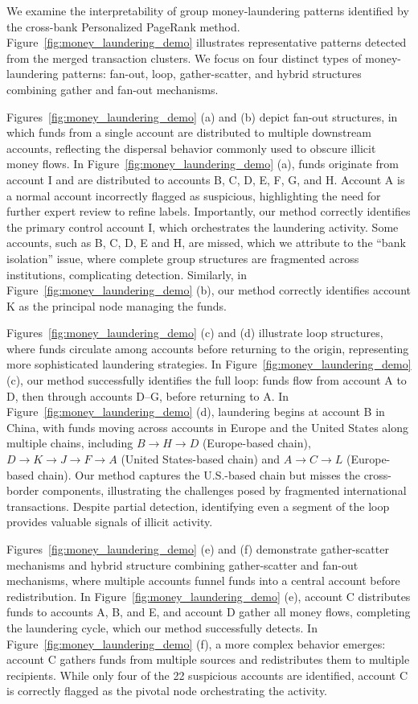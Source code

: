 \documentclass[11pt,english]{article}
\begin{document}
We examine the interpretability of group money-laundering patterns identified by the cross-bank Personalized PageRank method. Figure~\ref{fig:money_laundering_demo} illustrates representative patterns detected from the merged transaction clusters. We focus on four distinct types of money-laundering patterns: fan-out, loop, gather-scatter, and hybrid structures combining gather and fan-out mechanisms.

Figures~\ref{fig:money_laundering_demo} (a) and (b) depict fan-out structures, in which funds from a single account are distributed to multiple downstream accounts, reflecting the dispersal behavior commonly used to obscure illicit money flows. In Figure~\ref{fig:money_laundering_demo} (a), funds originate from account I and are distributed to accounts B, C, D, E, F, G, and H. Account A is a normal account incorrectly flagged as suspicious, highlighting the need for further expert review to refine labels. Importantly, our method correctly identifies the primary control account I, which orchestrates the laundering activity. Some accounts, such as B, C, D, E and H, are missed, which we attribute to the “bank isolation” issue, where complete group structures are fragmented across institutions, complicating detection. Similarly, in Figure~\ref{fig:money_laundering_demo} (b), our method correctly identifies account K as the principal node managing the funds.

Figures~\ref{fig:money_laundering_demo} (c) and (d) illustrate loop structures, where funds circulate among accounts before returning to the origin, representing more sophisticated laundering strategies. In Figure~\ref{fig:money_laundering_demo} (c), our method successfully identifies the full loop: funds flow from account A to D, then through accounts D–G, before returning to A. In Figure~\ref{fig:money_laundering_demo} (d), laundering begins at account B in China, with funds moving across accounts in Europe and the United States along multiple chains, including $B \rightarrow H \rightarrow D$ (Europe-based chain), $D \rightarrow K \rightarrow J \rightarrow F \rightarrow A$ (United States-based chain) and  $A \rightarrow C \rightarrow L$ (Europe-based chain). Our method captures the U.S.-based chain but misses the cross-border components, illustrating the challenges posed by fragmented international transactions. Despite partial detection, identifying even a segment of the loop provides valuable signals of illicit activity.

Figures~\ref{fig:money_laundering_demo} (e) and (f) demonstrate gather-scatter mechanisms and hybrid structure combining gather-scatter and fan-out mechanisms, where multiple accounts funnel funds into a central account before redistribution. In Figure~\ref{fig:money_laundering_demo} (e), account C distributes funds to accounts A, B, and E, and account D gather all money flows, completing the laundering cycle, which our method successfully detects. In Figure~\ref{fig:money_laundering_demo} (f), a more complex behavior emerges: account C gathers funds from multiple sources and redistributes them to multiple recipients. While only four of the 22 suspicious accounts are identified, account C is correctly flagged as the pivotal node orchestrating the activity.
\end{document}
